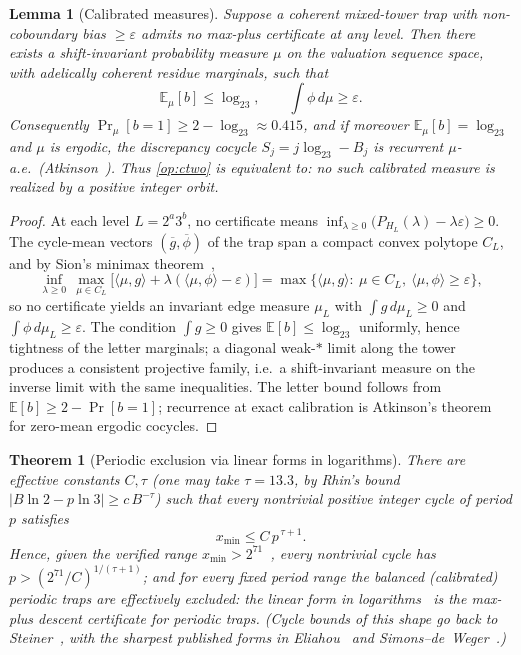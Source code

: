 \documentclass[11pt]{article}
\newcommand{\E}{\mathbb{E}}
\theoremstyle{plain}
\newtheorem{theorem}{Theorem}
\newtheorem{lemma}{Lemma}
\theoremstyle{definition}
\theoremstyle{remark}
\begin{document}
\begin{lemma}[Calibrated measures]\label{lem:calibrated}
Suppose a coherent mixed-tower trap with non-coboundary bias
$\ge\varepsilon$ admits no max-plus certificate at any level. Then there
exists a shift-invariant probability measure $\mu$ on the valuation
sequence space, with adelically coherent residue marginals, such that
\[
\E_\mu[b]\le\log_23,
\qquad
\textstyle\int\phi\,d\mu\ge\varepsilon .
\]
Consequently $\Pr_\mu[b{=}1]\ge2-\log_23\approx0.415$, and if moreover
$\E_\mu[b]=\log_23$ and $\mu$ is ergodic, the discrepancy cocycle
$S_j=j\log_23-B_j$ is recurrent $\mu$-a.e.\ (Atkinson~\cite{atkinson1976}). Thus
\cref{op:ctwo} is equivalent to: \emph{no such calibrated measure is
realized by a positive integer orbit}.
\end{lemma}

\begin{proof}
At each level $L=2^a3^b$, no certificate means
$\inf_{\lambda\ge0}\bigl(P_{H_L}(\lambda)-\lambda\varepsilon\bigr)\ge0$.
The cycle-mean vectors $(\overline g,\overline\phi)$ of the trap span a
compact convex polytope $C_L$, and by Sion's minimax theorem~\cite{sion1958},
\[
\inf_{\lambda\ge0}\,\max_{\mu\in C_L}
\bigl[\langle\mu,g\rangle+\lambda(\langle\mu,\phi\rangle-\varepsilon)\bigr]
=\max\bigl\{\langle\mu,g\rangle:\ \mu\in C_L,\
\langle\mu,\phi\rangle\ge\varepsilon\bigr\},
\]
so no certificate yields an invariant edge measure $\mu_L$ with
$\int g\,d\mu_L\ge0$ and $\int\phi\,d\mu_L\ge\varepsilon$. The condition
$\int g\ge0$ gives $\E[b]\le\log_23$ uniformly, hence tightness of the
letter marginals; a diagonal weak-$*$ limit along the tower produces a
consistent projective family, i.e.\ a shift-invariant measure on the
inverse limit with the same inequalities. The letter bound follows from
$\E[b]\ge2-\Pr[b{=}1]$; recurrence at exact calibration is Atkinson's
theorem~\cite{atkinson1976} for zero-mean ergodic cocycles.
\end{proof}

\begin{theorem}[Periodic exclusion via linear forms in logarithms]
\label{thm:bakercycle}
There are effective constants $C,\tau$ (one may take $\tau=13.3$, by
Rhin's bound~\cite{rhin1987} $|B\ln2-p\ln3|\ge c\,B^{-\tau}$) such that every
nontrivial positive integer cycle of period $p$ satisfies
\[
x_{\min}\le C\,p^{\,\tau+1}.
\]
Hence, given the verified range $x_{\min}>2^{71}$~\cite{barina2021}, every nontrivial
cycle has $p>(2^{71}/C)^{1/(\tau+1)}$; and for every fixed period range
the balanced (calibrated) periodic traps are effectively excluded: the
linear form in logarithms~\cite{baker1975} \emph{is} the max-plus descent certificate for
periodic traps. (Cycle bounds of this shape go back to
Steiner~\cite{steiner1977}, with the sharpest published forms in
Eliahou~\cite{eliahou1993} and Simons--de~Weger~\cite{simonsdeweger2005}.)
\end{theorem}
\end{document}
